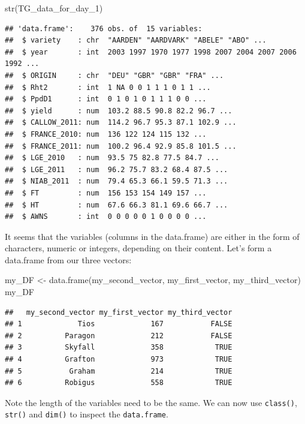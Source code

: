 \documentclass[
]{book}
\newenvironment{Shaded}{\begin{snugshade}}{\end{snugshade}}
\newcommand{\FunctionTok}[1]{\textcolor[rgb]{0.00,0.00,0.00}{#1}}
\newcommand{\NormalTok}[1]{#1}
\newcommand{\OtherTok}[1]{\textcolor[rgb]{0.56,0.35,0.01}{#1}}
\begin{document}
\begin{Shaded}
\begin{Highlighting}[]
\FunctionTok{str}\NormalTok{(TG\_data\_for\_day\_1)}
\end{Highlighting}
\end{Shaded}

\begin{verbatim}
## 'data.frame':    376 obs. of  15 variables:
##  $ variety    : chr  "AARDEN" "AARDVARK" "ABELE" "ABO" ...
##  $ year       : int  2003 1997 1970 1977 1998 2007 2004 2007 2006 1992 ...
##  $ ORIGIN     : chr  "DEU" "GBR" "GBR" "FRA" ...
##  $ Rht2       : int  1 NA 0 0 1 1 1 0 1 1 ...
##  $ PpdD1      : int  0 1 0 1 0 1 1 1 0 0 ...
##  $ yield      : num  103.2 88.5 90.8 82.2 96.7 ...
##  $ CALLOW_2011: num  114.2 96.7 95.3 87.1 102.9 ...
##  $ FRANCE_2010: num  136 122 124 115 132 ...
##  $ FRANCE_2011: num  100.2 96.4 92.9 85.8 101.5 ...
##  $ LGE_2010   : num  93.5 75 82.8 77.5 84.7 ...
##  $ LGE_2011   : num  96.2 75.7 83.2 68.4 87.5 ...
##  $ NIAB_2011  : num  79.4 65.3 66.1 59.5 71.3 ...
##  $ FT         : num  156 153 154 149 157 ...
##  $ HT         : num  67.6 66.3 81.1 69.6 66.7 ...
##  $ AWNS       : int  0 0 0 0 0 1 0 0 0 0 ...
\end{verbatim}

It seems that the variables (columns in the data.frame) are either in the form of characters, numeric or integers, depending on their content. Let's form a data.frame from our three vectors:

\begin{Shaded}
\begin{Highlighting}[]
\NormalTok{my\_DF }\OtherTok{\textless{}{-}} \FunctionTok{data.frame}\NormalTok{(my\_second\_vector, my\_first\_vector, my\_third\_vector)}
\NormalTok{my\_DF}
\end{Highlighting}
\end{Shaded}

\begin{verbatim}
##   my_second_vector my_first_vector my_third_vector
## 1             Tios             167           FALSE
## 2          Paragon             212           FALSE
## 3          Skyfall             358            TRUE
## 4          Grafton             973            TRUE
## 5           Graham             214            TRUE
## 6          Robigus             558            TRUE
\end{verbatim}

Note the length of the variables need to be the same. We can now use \texttt{class()}, \texttt{str()} and \texttt{dim()} to inspect the \texttt{data.frame}.
\end{document}
